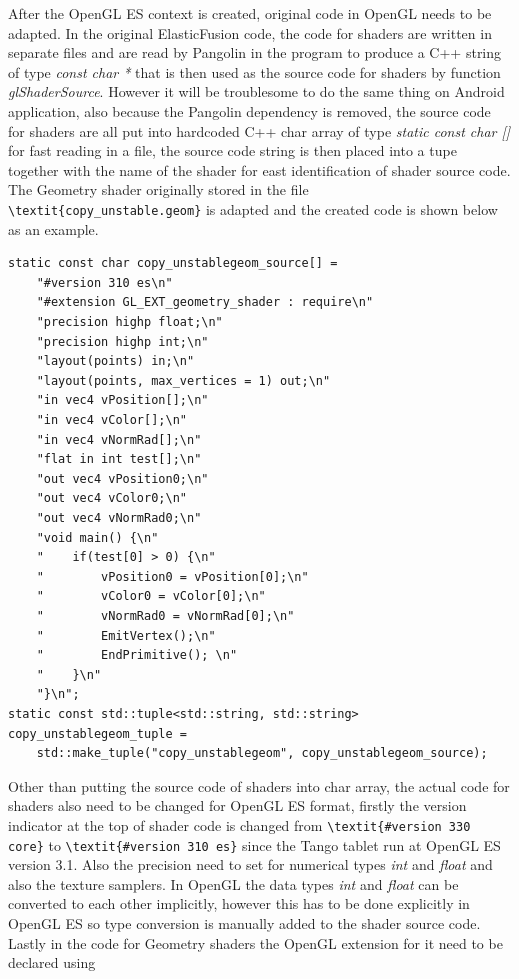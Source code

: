 \documentclass[12pt,twoside]{article}
\begin{document}
After the OpenGL ES context is created, original code in OpenGL needs to be adapted. In the original ElasticFusion code, the code for shaders are written in separate files and are read by Pangolin in the program to produce a C++ string of type \textit{const char *} that is then used as the source code for shaders by function \textit{glShaderSource}. However it will be troublesome to do the same thing on Android application, also because the Pangolin dependency is removed, the source code for shaders are all put into hardcoded C++ char array of type \textit{static const char []} for fast reading in a file, the source code string is then placed into a tupe together with the name of the shader for east identification of shader source code. The Geometry shader originally stored in the file \verb| \textit{copy_unstable.geom}| is adapted and the created code is shown below as an example.\\
\begin{lstlisting}
static const char copy_unstablegeom_source[] =
    "#version 310 es\n"
    "#extension GL_EXT_geometry_shader : require\n"
    "precision highp float;\n"
    "precision highp int;\n"
    "layout(points) in;\n"
    "layout(points, max_vertices = 1) out;\n"
    "in vec4 vPosition[];\n"
    "in vec4 vColor[];\n"
    "in vec4 vNormRad[];\n"
    "flat in int test[];\n"
    "out vec4 vPosition0;\n"
    "out vec4 vColor0;\n"
    "out vec4 vNormRad0;\n"
    "void main() {\n"
    "    if(test[0] > 0) {\n"
    "        vPosition0 = vPosition[0];\n"
    "        vColor0 = vColor[0];\n"
    "        vNormRad0 = vNormRad[0];\n"
    "        EmitVertex();\n"
    "        EndPrimitive(); \n"
    "    }\n"
    "}\n";
static const std::tuple<std::string, std::string> copy_unstablegeom_tuple =
    std::make_tuple("copy_unstablegeom", copy_unstablegeom_source);
\end{lstlisting}
Other than putting the source code of shaders into char array, the actual code for shaders also need to be changed for OpenGL ES format, firstly the version indicator at the top of shader code is changed from \verb|\textit{#version 330 core}| to \verb|\textit{#version 310 es}| since the Tango tablet run at OpenGL ES version 3.1. Also the precision need to set for numerical types \textit{int} and \textit{float} and also the texture samplers. In OpenGL the data types  \textit{int} and \textit{float} can be converted to each other implicitly, however this has to be done explicitly in OpenGL ES so type conversion is manually added to the shader source code. Lastly in the code for Geometry shaders the OpenGL extension for it need to be declared using \\
\end{document}
